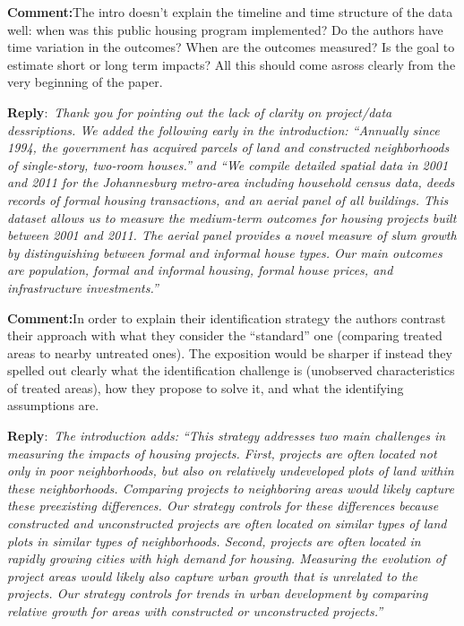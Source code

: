 \documentclass{article}
\newcounter{reviewer}
\newcounter{point}[reviewer]
\newcommand{\reply}{\medskip \noindent \textbf{Reply}:\ \textit }
\newcommand{\sr}{\begin{minipage}{\dimexpr\textwidth-3cm}}
\newcommand{\er}{\end{minipage}}
\newcommand{\cc}{\medskip \noindent \textbf{Comment:}\hspace{2em}}
\begin{document}
\cc The intro doesn’t explain the timeline and time structure of the data well: when was this public housing program implemented? Do the authors have time variation in the outcomes? When are the outcomes measured? Is the goal to estimate short or long term impacts? All this should come asross clearly from the very beginning of the paper.

\sr
\reply{Thank you for pointing out the lack of clarity on project/data dessriptions.  We added the following early in the introduction: ``Annually since 1994, the government has acquired parcels of land and constructed neighborhoods of single-story, two-room houses.'' and ``We compile detailed spatial data in 2001 and 2011 for the Johannesburg metro-area including household census data, deeds records of formal housing transactions, and an aerial panel of all buildings.  This dataset allows us to measure the medium-term outcomes for housing projects built between 2001 and 2011.   The aerial panel provides a novel measure of slum growth by distinguishing between formal and informal house types.  Our main outcomes are population, formal and informal housing, formal house prices, and infrastructure investments.'' }\\
\er

\cc In order to explain their identification strategy the authors contrast their approach with what they consider the “standard” one (comparing treated areas to nearby untreated ones). The exposition would be sharper if instead they spelled out clearly what the identification challenge is (unobserved characteristics of treated areas), how they propose to solve it, and what the identifying assumptions are.

\sr
\reply{The introduction adds: ``This strategy addresses two main challenges in measuring the impacts of housing projects.  First, projects are often located not only in poor neighborhoods, but also on relatively undeveloped plots of land within these neighborhoods.  Comparing projects to neighboring areas would likely capture these preexisting differences.  Our strategy controls for these differences because constructed and unconstructed projects are often located on similar types of land plots in similar types of neighborhoods.  Second, projects are often located in rapidly growing cities with high demand for housing.  Measuring the evolution of project areas would likely also capture urban growth that is unrelated to the projects.  Our strategy controls for trends in urban development by comparing relative growth for areas with constructed or unconstructed projects.''}\\
\er
\end{document}
